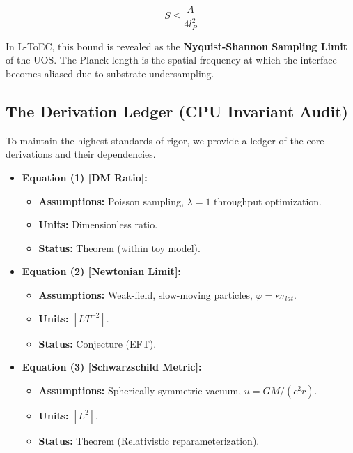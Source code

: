 \documentclass[11pt,titlepage]{article}
\begin{document}
\begin{equation}
S \le \frac{A}{4l_P^2}
\end{equation}

In L-ToEC, this bound is revealed as the \textbf{Nyquist-Shannon Sampling Limit} of the UOS. The Planck length is the spatial frequency at which the interface becomes aliased due to substrate undersampling.

\subsection{The Derivation Ledger (CPU Invariant Audit)}
To maintain the highest standards of rigor, we provide a ledger of the core derivations and their dependencies.

\begin{itemize}
    
\item \textbf{Equation (1) [DM Ratio]:} 
        \begin{itemize}
            
\item \textbf{Assumptions:} Poisson sampling, $\lambda=1$ throughput optimization.
            
\item \textbf{Units:} Dimensionless ratio.
            
\item \textbf{Status:} Theorem (within toy model).
        \end{itemize}
    
\item \textbf{Equation (2) [Newtonian Limit]:}
        \begin{itemize}
            
\item \textbf{Assumptions:} Weak-field, slow-moving particles, $\varphi = \kappa  \tau_{lat}$.
            
\item \textbf{Units:} $[L T^{-2}]$.
            
\item \textbf{Status:} Conjecture (EFT).
        \end{itemize}
    
\item \textbf{Equation (3) [Schwarzschild Metric]:}
        \begin{itemize}
            
\item \textbf{Assumptions:} Spherically symmetric vacuum, $u = GM/(c^2 r)$.
            
\item \textbf{Units:} $[L^2]$.
            
\item \textbf{Status:} Theorem (Relativistic reparameterization).
        \end{itemize}
\end{itemize}
\end{document}
